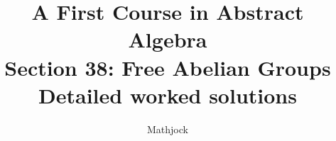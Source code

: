 
\title{\textbf{A First Course in Abstract Algebra}\\[0.3em]Section 38: Free Abelian Groups\\[0.3em]\large Detailed worked solutions}
\author{Mathjock}
\date{}

\maketitle
\bookinfo
\tableofcontents
\clearpage
\renewcommand{\thesection}{38}
\renewcommand{\theHsection}{fraleigh.38}


